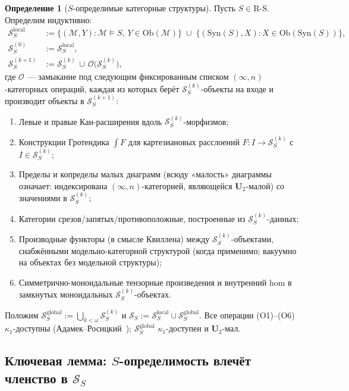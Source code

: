 \documentclass[11pt]{article}
\theoremstyle{plain}
\theoremstyle{definition}
\newtheorem{definition}[theorem]{Определение}
\newcommand{\RS}{\mathrm{R\text{-}S}}
\newcommand{\cS}{\mathcal{S}}
\newcommand{\cM}{\mathcal{M}}
\newcommand{\Ob}{\mathrm{Ob}}
\newcommand{\Syn}{\mathrm{Syn}}
\begin{document}
\begin{definition}[$S$-определимые категорные структуры]\label{def:SS}
Пусть $S \in \RS$. Определим индуктивно:
\begin{align*}
\cS_S^{\mathrm{local}} &:= \{(\cM, Y) : \cM \models S,\ Y \in \Ob(\cM)\} \;\cup\; \{(\Syn(S), X) : X \in \Ob(\Syn(S))\}, \\
\cS_S^{(0)} &:= \cS_S^{\mathrm{local}}, \\
\cS_S^{(k+1)} &:= \cS_S^{(k)} \,\cup\, \mathcal{O}\bigl(\cS_S^{(k)}\bigr),
\end{align*}
где $\mathcal{O}$ — замыкание под следующим фиксированным списком $(\infty, n)$-категорных операций, каждая из которых берёт $\cS_S^{(k)}$-объекты на входе и производит объекты в $\cS_S^{(k+1)}$:
\begin{enumerate}[nosep,label=\textrm{(O\arabic*)}]
\item Левые и правые Кан-расширения вдоль $\cS_S^{(k)}$-морфизмов;
\item Конструкции Гротендика $\int F$ для картезиановых расслоений $F : I \to \cS_S^{(k)}$ с $I \in \cS_S^{(k)}$;
\item Пределы и копределы малых диаграмм (всюду «малость» диаграммы означает: индексирована $(\infty, n)$-категорией, являющейся $\mathbf{U}_2$-малой) со значениями в $\cS_S^{(k)}$;
\item Категории срезов/запятых/противоположные, построенные из $\cS_S^{(k)}$-данных;
\item Производные функторы (в смысле Квиллена) между $\cS_S^{(k)}$-объектами, снабжёнными модельно-категорной структурой (когда применимо; вакуумно на объектах без модельной структуры);
\item Симметрично-моноидальные тензорные произведения и внутренний hom в замкнутых моноидальных $\cS_S^{(k)}$-объектах.
\end{enumerate}
Положим $\cS_S^{\mathrm{global}} := \bigcup_{k < \omega} \cS_S^{(k)}$ и $\cS_S := \cS_S^{\mathrm{local}} \cup \cS_S^{\mathrm{global}}$. Все операции (O1)--(O6) $\kappa_1$-доступны (Адамек--Росицкий~\cite{AdamekRosicky1994}); $\cS_S^{\mathrm{global}}$ $\kappa_1$-доступен и $\mathbf{U}_2$-мал.
\end{definition}

\subsection{\texorpdfstring{Ключевая лемма: $S$-определимость влечёт членство в $\cS_S$}{Ключевая лемма: S-определимость влечёт членство в S\_S}}
\end{document}
